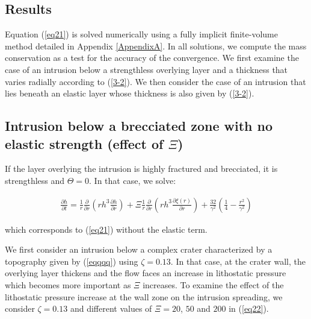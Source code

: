 \begin{article}
        \section{Results}
	
	Equation  (\ref{eq21}) is  solved  numerically  using a  fully
        implicit   finite-volume    method   detailed    in   Appendix
        \ref{AppendixA}.  In  all  solutions,   we  compute  the  mass
        conservation as a test for the accuracy of the convergence. We
        first examine  the case of  an intrusion below  a strengthless
        overlying layer and a thickness that varies radially according
        to (\ref{3-2}). We then consider the case of an intrusion that
        lies beneath an elastic layer whose thickness is also given by
        (\ref{3-2}).
	
	\subsection{Intrusion below a brecciated  zone with no elastic
          strength (effect of $\Xi$)}
        \label{Strengthless_Layer1}
        If the layer  overlying the intrusion is  highly fractured and
        brecciated, it  is strengthless and $\Theta=0$.  In that case,
        we solve:
 
        \begin{eqnarray}
          \label{eq22}
          \frac{\partial h}{\partial t}=\frac{1}{r} \frac{\partial}{\partial r}\left (rh^{3} \frac{\partial h}{\partial r} \right)+ \Xi \frac{1}{r} \frac{\partial}{\partial r}\left ( rh^{3}\frac{\partial \xi(r)}{\partial r}\right )+\frac{32}{\gamma^{2}} \left(\frac{1}{4}-\frac{r^{2}}{\gamma^{2}}\right) 
        \end{eqnarray}

        which corresponds to (\ref{eq21}) without the elastic term.

	We  first  consider  an   intrusion  below  a  complex  crater
        characterized  by a  topography given  by (\ref{eqqqq})  using
        $\zeta=0.13$. In that case, at  the crater wall, the overlying
        layer thickens and  the flow faces an  increase in lithostatic
        pressure which becomes more  important as $\Xi$ increases.  To
        examine the effect of the lithostatic pressure increase at the
        wall zone on the intrusion spreading, we consider $\zeta=0.13$
        and  different   values  of   $\Xi=20$,  $50$  and   $200$  in
        (\ref{eq22}).


\end{article}
